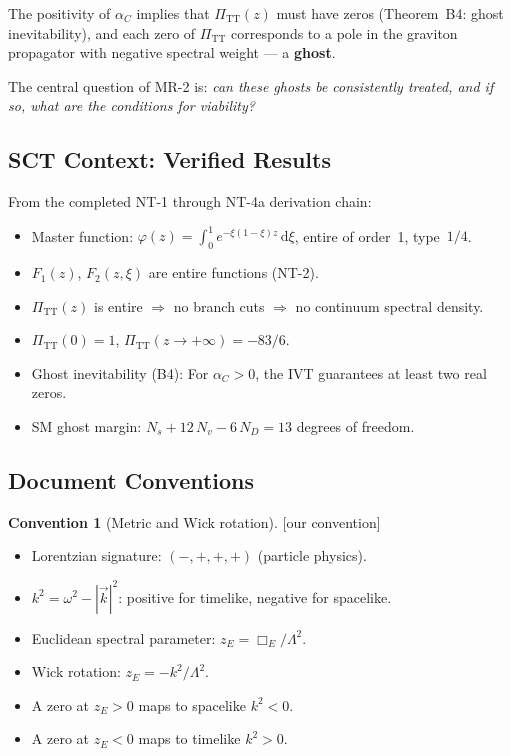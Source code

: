 \documentclass[11pt,a4paper]{article}
\theoremstyle{plain}
\theoremstyle{definition}
\newtheorem{convention}[theorem]{Convention}
\theoremstyle{remark}
\newcommand{\dd}{\mathrm{d}}
\newcommand{\PiTT}{\Pi_{\mathrm{TT}}}
\newcommand{\oursign}{\textcolor{teal!80!black}{\textsf{[our convention]}}}
\begin{document}
The positivity of $\alpha_C$ implies that $\PiTT(z)$ must have zeros
(Theorem~B4: ghost inevitability), and each zero of $\PiTT$
corresponds to a pole in the graviton propagator with negative spectral
weight --- a \textbf{ghost}.

The central question of MR-2 is: \emph{can these ghosts be consistently
treated, and if so, what are the conditions for viability?}

\subsection{SCT Context: Verified Results}

From the completed NT-1 through NT-4a derivation chain:
\begin{itemize}[nosep]
  \item Master function: $\varphi(z) = \int_0^1 e^{-\xi(1-\xi)z}\,\dd\xi$,
    entire of order~1, type~$1/4$.
  \item $F_1(z)$, $F_2(z,\xi)$ are entire functions (NT-2).
  \item $\PiTT(z)$ is entire $\Rightarrow$ no branch cuts $\Rightarrow$
    no continuum spectral density.
  \item $\PiTT(0) = 1$, $\PiTT(z \to +\infty) = -83/6$.
  \item Ghost inevitability (B4): For $\alpha_C > 0$, the IVT guarantees
    at least two real zeros.
  \item SM ghost margin: $N_s + 12\,N_v - 6\,N_D = 13$ degrees of freedom.
\end{itemize}

\subsection{Document Conventions}
\label{sec:conventions}

\begin{convention}[Metric and Wick rotation]
\label{conv:metric}
\oursign\
\begin{itemize}[nosep]
  \item Lorentzian signature: $(-,+,+,+)$ (particle physics).
  \item $k^2 = \omega^2 - |\vec{k}|^2$: positive for timelike, negative
    for spacelike.
  \item Euclidean spectral parameter: $z_E = \Box_E/\Lambda^2$.
  \item Wick rotation: $z_E = -k^2/\Lambda^2$.
  \item A zero at $z_E > 0$ maps to spacelike $k^2 < 0$.
  \item A zero at $z_E < 0$ maps to timelike $k^2 > 0$.
\end{itemize}
\end{convention}
\end{document}
